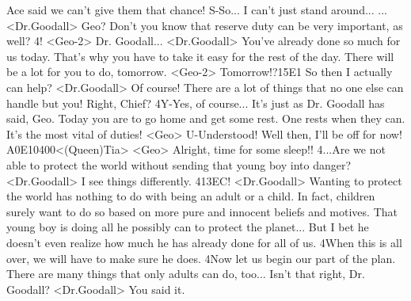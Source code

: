 Ace said we can't give them that chance! 
S-So... I can't just stand around... 
... 
<Dr.Goodall> Geo? 
Don't you know that reserve duty can be very important, as well? 
4! 
<Geo-2> Dr. Goodall... 
<Dr.Goodall> You've already done so much for us today. 
That's why you have to take it easy for the rest of the day. 
There will be a lot for you to do, tomorrow. 
<Geo-2> Tomorrow!?{15}{E1} So then I actually can help? 
<Dr.Goodall> Of course! 
There are a lot of things that no one else can handle but you! 
Right, Chief? 
4Y-Yes, of course... 
It's just as Dr. Goodall has said, Geo. 
Today you are to go home and get some rest. 
One rests when they can. It's the most vital of duties! 
<Geo> U-Understood! 
Well then, I'll be off for now! 
{A0}{E1}{04}{00}<(Queen)Tia> 
<Geo> Alright, time for some sleep!! 
4...Are we not able to protect the world without sending that young boy into danger? 
<Dr.Goodall> I see things differently. 
4{13}{EC}! 
<Dr.Goodall> Wanting to protect the world has nothing to do with being an adult or a child. 
In fact, children surely want to do so based on more 
pure and innocent beliefs and motives. 
That young boy is doing all he possibly can to protect the planet... 
But I bet he doesn't even realize how much he has already done for all of us. 
4When this is all over, we will have to make sure he does. 
4Now let us begin our part of the plan. 
There are many things that only adults can do, too... 
Isn't that right, Dr. Goodall? 
<Dr.Goodall> You said it. 

